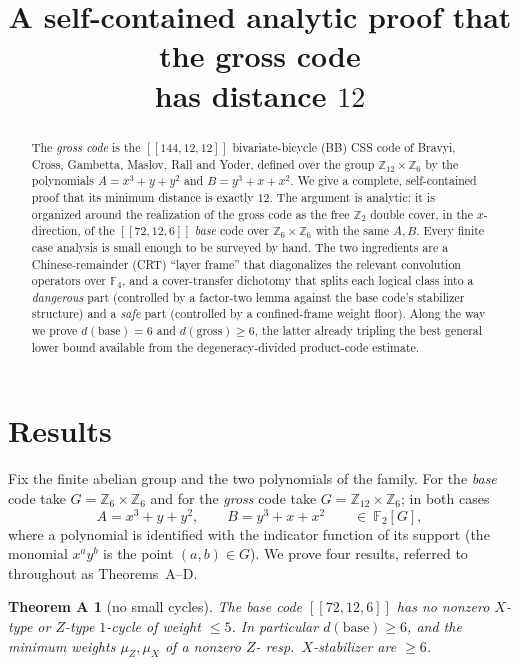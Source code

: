 \documentclass[11pt]{article}
\title{A self-contained analytic proof that the gross code\\ has distance $12$}
\author{}
\date{}
\newcommand{\Z}{\mathbb{Z}}
\newcommand{\F}[1]{\mathbb{F}_{#1}}
\theoremstyle{plain}
\newtheorem*{thmA}{Theorem A}
\theoremstyle{definition}
\theoremstyle{remark}
\begin{document}
\maketitle

\begin{abstract}
The \emph{gross code} is the $[[144,12,12]]$ bivariate-bicycle (BB) CSS code of
Bravyi, Cross, Gambetta, Maslov, Rall and Yoder, defined over the group
$\Z_{12}\times\Z_6$ by the polynomials $A=x^3+y+y^2$ and $B=y^3+x+x^2$. We give a
complete, self-contained proof that its minimum distance is exactly $12$. The argument is
analytic: it is organized around the realization of the gross code as the free $\Z_2$
double cover, in the $x$-direction, of the $[[72,12,6]]$ \emph{base} code over
$\Z_6\times\Z_6$ with the same $A,B$. Every finite case analysis is small enough to be
surveyed by hand. The two ingredients are a Chinese-remainder (CRT) ``layer frame'' that
diagonalizes the relevant convolution operators over $\F4$, and a cover-transfer
dichotomy that splits each logical class into a \emph{dangerous} part (controlled by a
factor-two lemma against the base code's stabilizer structure) and a \emph{safe} part
(controlled by a confined-frame weight floor). Along the way we prove $d(\mathrm{base})=6$
and $d(\mathrm{gross})\ge 6$, the latter already tripling the best general lower bound
available from the degeneracy-divided product-code estimate.
\end{abstract}

\section{Results}\label{sec:results}

Fix the finite abelian group and the two polynomials of the family. For the
\emph{base} code take $G=\Z_6\times\Z_6$ and for the \emph{gross} code take
$G=\Z_{12}\times\Z_6$; in both cases
\[
  A=x^3+y+y^2,\qquad B=y^3+x+x^2\qquad\in\ \F2[G],
\]
where a polynomial is identified with the indicator function of its support (the monomial
$x^a y^b$ is the point $(a,b)\in G$). We prove four results, referred to throughout as
Theorems~A--D.

\begin{thmA}[no small cycles]
The base code $[[72,12,6]]$ has no nonzero $X$-type or $Z$-type $1$-cycle of weight
$\le 5$. In particular $d(\mathrm{base})\ge 6$, and the minimum weights $\mu_Z,\mu_X$ of a
nonzero $Z$- resp.\ $X$-stabilizer are $\ge 6$.
\end{thmA}
\end{document}
